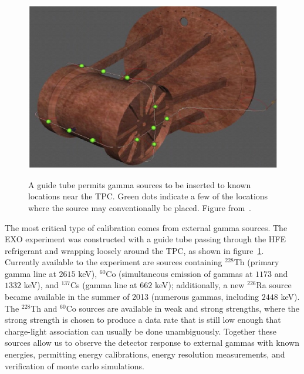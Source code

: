 \begin{figure}
\begin{center}
\includegraphics[keepaspectratio=true,width=\textwidth]{calibration_tube.jpg}
\end{center}
\renewcommand{\baselinestretch}{1}
\small\normalsize
\begin{quote}
\caption{A guide tube permits gamma sources to be inserted to known locations near the TPC.  Green dots indicate a few of the locations where the source may conventionally be placed.  Figure from~\cite{detectorPartI}.}
\label{fig:CalibrationGuideTube}
\end{quote}
\end{figure}
\renewcommand{\baselinestretch}{2}
\small\normalsize

The most critical type of calibration comes from external gamma sources.  The EXO experiment was constructed with a guide tube passing through the HFE refrigerant and wrapping loosely around the TPC, as shown in figure~\ref{fig:CalibrationGuideTube}.  Currently available to the experiment are sources containing $^{228}$Th (primary gamma line at $2615$ keV), $^{60}$Co (simultaneous emission of gammas at $1173$ and $1332$ keV), and $^{137}$Cs (gamma line at $662$ keV); additionally, a new $^{226}$Ra source became available in the summer of 2013 (numerous gammas, including $2448$ keV).  The $^{228}$Th and $^{60}$Co sources are available in weak and strong strengths, where the strong strength is chosen to produce a data rate that is still low enough that charge-light association can usually be done unambiguously.  Together these sources allow us to observe the detector response to external gammas with known energies, permitting energy calibrations, energy resolution measurements, and verification of monte carlo simulations.

